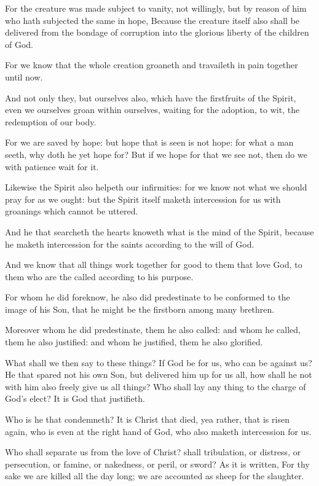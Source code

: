 \Verse For the creature was made subject to vanity, not willingly, but by reason of him who hath subjected the same in hope, \Verse Because the creature itself also shall be delivered from the bondage of corruption into the glorious liberty of the children of God.

\Verse For we know that the whole creation groaneth and travaileth in pain together until now.

\Verse And not only they, but ourselves also, which have the firstfruits of the Spirit, even we ourselves groan within ourselves, waiting for the adoption, to wit, the redemption of our body.

\Verse For we are saved by hope: but hope that is seen is not hope: for what a man seeth, why doth he yet hope for?  \Verse But if we hope for that we see not, then do we with patience wait for it.

\Verse Likewise the Spirit also helpeth our infirmities: for we know not what we should pray for as we ought: but the Spirit itself maketh intercession for us with groanings which cannot be uttered.

\Verse And he that searcheth the hearts knoweth what is the mind of the Spirit, because he maketh intercession for the saints according to the will of God.

\Verse And we know that all things work together for good to them that love God, to them who are the called according to his purpose.

\Verse For whom he did foreknow, he also did predestinate to be conformed to the image of his Son, that he might be the firstborn among many brethren.

\Verse Moreover whom he did predestinate, them he also called: and whom he called, them he also justified: and whom he justified, them he also glorified.

\Verse What shall we then say to these things? If God be for us, who can be against us?  \Verse He that spared not his own Son, but delivered him up for us all, how shall he not with him also freely give us all things?  \Verse Who shall lay any thing to the charge of God's elect? It is God that justifieth.

\Verse Who is he that condemneth? It is Christ that died, yea rather, that is risen again, who is even at the right hand of God, who also maketh intercession for us.

\Verse Who shall separate us from the love of Christ? shall tribulation, or distress, or persecution, or famine, or nakedness, or peril, or sword?  \Verse As it is written, For thy sake we are killed all the day long; we are accounted as sheep for the slaughter.

